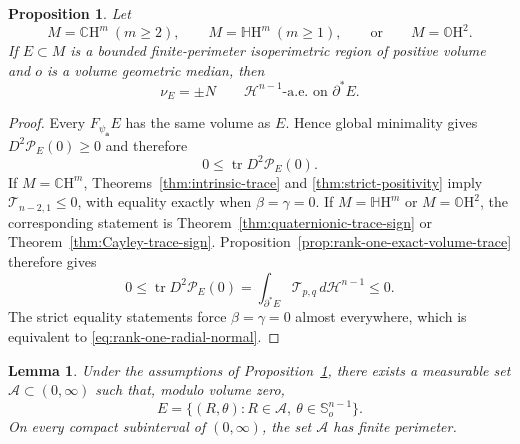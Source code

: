 \documentclass[11pt,reqno]{amsart}
\numberwithin{equation}{section}
\newtheorem{proposition}[theorem]{Proposition}
\newtheorem{lemma}[theorem]{Lemma}
\theoremstyle{definition}
\theoremstyle{remark}
\newcommand{\CH}{\mathbb{C}\mathrm{H}}
\newcommand{\HH}{\mathbb{H}\mathrm{H}}
\newcommand{\OH}{\mathbb{O}\mathrm{H}}
\begin{document}
\begin{proposition}
\label{prop:rank-one-reduced-boundary-radiality}
Let
\[
 M=\CH^m\ (m\ge2),\qquad M=\HH^m\ (m\ge1),
 \qquad\text{or}\qquad M=\OH^2.
\]
If $E\subset M$ is a bounded finite-perimeter isoperimetric region of
positive volume and $o$ is a volume geometric median, then
\begin{equation}
 \nu_E=\pm N
 \qquad
 \mathcal H^{n-1}\text{-a.e. on }\partial^*E.
 \label{eq:rank-one-radial-normal}
\end{equation}
\end{proposition}

\begin{proof}
Every $F_{\psi_{\mathbf a}}E$ has the same volume as $E$.  Hence global
minimality gives $D^2\mathscr P_E(0)\ge0$ and therefore
\[
 0\le\operatorname{tr}D^2\mathscr P_E(0).
\]
If $M=\CH^m$, Theorems~\ref{thm:intrinsic-trace} and
\ref{thm:strict-positivity} imply
$\mathscr T_{n-2,1}\le0$, with equality exactly when
$\beta=\gamma=0$.  If $M=\HH^m$ or $M=\OH^2$, the corresponding statement is
Theorem~\ref{thm:quaternionic-trace-sign} or
Theorem~\ref{thm:Cayley-trace-sign}.  Proposition~\ref{prop:rank-one-exact-volume-trace}
therefore gives
\[
 0\le \operatorname{tr}D^2\mathscr P_E(0)
 =\int_{\partial^*E}\mathscr T_{p,q}\,d\mathcal H^{n-1}\le0.
\]
The strict equality statements force $\beta=\gamma=0$ almost everywhere,
which is equivalent to \eqref{eq:rank-one-radial-normal}.
\end{proof}

\begin{lemma}
\label{lem:rank-one-BV-radiality}
Under the assumptions of Proposition~\ref{prop:rank-one-reduced-boundary-radiality},
there exists a measurable set $\mathscr A\subset(0,\infty)$ such that, modulo
volume zero,
\begin{equation}
 E=\{(R,\theta):R\in\mathscr A,\ \theta\in\mathbb S_o^{n-1}\}.
 \label{eq:rank-one-radial-set}
\end{equation}
On every compact subinterval of $(0,\infty)$, the set $\mathscr A$ has finite
perimeter.
\end{lemma}
\end{document}
